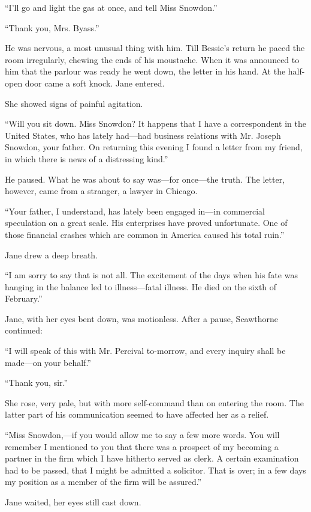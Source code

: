 ``I'll go and light the gas at once, and tell Miss Snowdon.''

``Thank you, Mrs. Byass.''

He was nervous, a most unusual thing with him. Till Bessie's return he
paced the room irregularly, chewing the ends of his moustache. When it
was announced to him that the parlour was ready he went down, the letter
in his hand. At the half-open door came a soft knock. Jane entered.

She showed signs of painful agitation.

``Will you sit down. Miss Snowdon? It happens that I have a
correspondent in the United States, who has lately had---had business
relations with Mr. Joseph Snowdon, your {}father. On returning this
evening I found a letter from my friend, in which there is news of a
distressing kind.''

He paused. What he was about to say was---for once---the truth. The
letter, however, came from a stranger, a lawyer in Chicago.

``Your father, I understand, has lately been engaged in---in commercial
speculation on a great scale. His enterprises have proved unfortunate.
One of those financial crashes which are common in America caused his
total ruin.''

Jane drew a deep breath.

``I am sorry to say that is not all. The excitement of the days when his
fate was hanging in the balance led to illness---fatal illness. He died
on the sixth of February.''

Jane, with her eyes bent down, was motionless. After a pause, Scawthorne
continued:

``I will speak of this with Mr. Percival to-morrow, and every inquiry
shall be made---on your behalf.''

``Thank you, sir.''

She rose, very pale, but with more self-command than on entering the
room. The latter part of his communication seemed to have affected her
as a relief.

{}``Miss Snowdon,---if you would allow me to say a few more words. You
will remember I mentioned to you that there was a prospect of my
becoming a partner in the firm wbich I have hitherto served as clerk. A
certain examination had to be passed, that I might be admitted a
solicitor. That is over; in a few days my position as a member of the
firm will be assured.''

Jane waited, her eyes still cast down.


